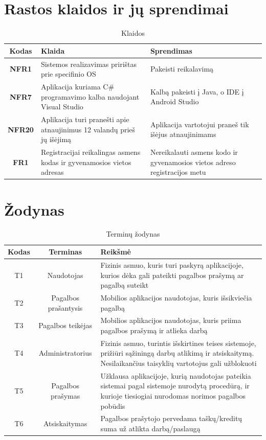 \documentclass{VUMIFPSbakalaurinis}
\begin{document}
\appendix
\section{Rastos klaidos ir jų sprendimai}
\begin{table}[H]\footnotesize
	\centering
	\caption{Klaidos}
	{
	\setlength{\arrayrulewidth}{0.25mm}
	{\begin{tabular}{|c|m{5.75cm}|m{5.75cm}|} \hline
		Kodas & Klaida & Sprendimas \\
		\hline
		\textbf{NFR1} & Sistemos realizavimas pririštas prie specifinio OS & Pakeisti reikalavimą \\
		\textbf{NFR7} & Aplikacija kuriama C\# programavimo kalba naudojant Visual Studio & Kalbą pakeisti į Java, o IDE į Android Studio \\
		\textbf{NFR20} & Aplikacija turi pranešti apie atnaujinimus 12 valandų prieš jų išėjimą & Aplikacija vartotojui praneš tik išėjus atnaujinimams \\
		\textbf{FR1} & Registracijai reikalingas asmens kodas ir gyvenamosios vietos adresas & Nereikalauti asmens kodo ir gyvenamosios vietos adreso registracijos metu \\
		\hline
	\end{tabular}}
	}
	\label{tab:table example}
\end{table}

\section{Žodynas}
\begin{table}[H]\footnotesize
	\centering
	\caption{Terminų žodynas}
	{
	\setlength{\arrayrulewidth}{0.25mm}
	{\begin{tabular}{|c|c|m{11.5cm}|} \hline
		Kodas & Terminas & Reikšmė \\
		\hline
		T1 & Naudotojas & Fizinis asmuo, kuris turi paskyrą aplikacijoje, kurios dėka gali pateikti pagalbos prašymą ar pagalbą suteikt \\
		T2 & Pagalbos prašantysis & Mobilios aplikacijos naudotojas, kuris išsikviečia pagalbą \\
		T3 & Pagalbos teikėjas & Mobilios aplikacijos naudotojas, kuris  priima pagalbos prašymą ir atlieka darbą \\
		T4 & Administratorius & Fizinis asmuo, turintis išskirtines teises sistemoje, prižiūri sąžiningą darbų atlikimą ir atsiskaitymą. Nesilaikančius taisyklių vartotojus gali užblokuoti \\
		T5 & Pagalbos prašymas & Užklausa aplikacijoje, kurią naudotojas pateikia sistemai pagal sistemoje nurodytą procedūrą, ir kurioje tiesiogiai nurodomas norimos pagalbos pobūdis \\
		T6 & Atsiskaitymas & Pagalbos prašytojo pervedama taškų/kreditų suma už atlikta darbą/paslaugą \\
		\hline
	\end{tabular}}
	}
	\label{tab:table example}
\end{table}
	
\end{document}

